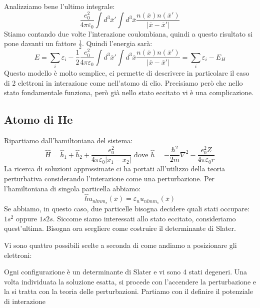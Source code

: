 Analizziamo bene l'ultimo integrale:
\begin{equation*}
    \frac{e_0^2}{4\pi\varepsilon_0}\int d^3 \overline x'\int d^3 \overline x \frac{n(\overline x)n(\overline{x}')}{|\overline x - \overline{x}'|}
\end{equation*}
Stiamo contando due volte l'interazione coulombiana, quindi a questo risultato si pone davanti un fattore $\frac 12$. Quindi l'energia sarà:
\begin{equation*}
    E=\sum_i\varepsilon_i - \frac 12 \frac{e_0^2}{4\pi\varepsilon_0}\int d^3 \overline x'\int d^3 \overline x \frac{n(\overline x)n(\overline{x}')}{|\overline x - \overline{x}'|} = \sum_i\varepsilon_i - E_H
\end{equation*}
Questo modello è molto semplice, ci permette di descrivere in particolare il caso di 2 elettroni in interazione come nell'atomo di elio. Precisiamo però che nello stato fondamentale funziona, però già nello stato eccitato vi è una complicazione.
\subsection*{Atomo di He}
Ripartiamo dall'hamiltoniana del sistema:
\begin{equation*}
    \hat H = \hat h_1 + \hat h_2 + \frac{e_0^2}{4\pi\varepsilon_0 |\overline{x}_1-\overline{x}_2|} \text{   dove   } \hat h = -\frac{\hbar^2}{2m}\nabla^2-\frac{e_0^2 Z}{4\pi\varepsilon_0 r}
\end{equation*}
La ricerca di soluzioni approssimate ci ha portati all'utilizzo della teoria perturbativa considerando l'interazione come una perturbazione. Per l'hamiltoniana di singola particella abbiamo:
\begin{equation*}
    \hat h u_{nlmm_s}(\overline x)=\varepsilon_nu_{nlmm_s}(\overline x)
\end{equation*}
Se abbiamo, in questo caso, due particelle bisogna decidere quali stati occupare: $1s^2$ oppure $1s2s$. Siccome siamo interessati allo stato eccitato, consideriamo quest'ultima. Bisogna ora scegliere come costruire il determinante di Slater.

Vi sono quattro possibili scelte a seconda di come andiamo a posizionare gli elettroni:

Ogni configurazione è un determinante di Slater e vi sono 4 stati degeneri. Una volta individuata la soluzione esatta, si procede con l'accendere la perturbazione e la si tratta con la teoria delle perturbazioni. Partiamo con il definire il potenziale di interazione

